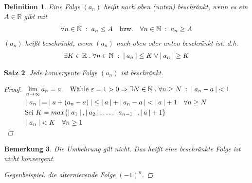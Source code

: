 \documentclass[a4paper,titlepage,oneside]{article}
\def\N{\ensuremath{\mathbb{N}} }
\def\R{\ensuremath{\mathbb{R}} }
\renewcommand{\epsilon}{\ensuremath{\varepsilon} }
\def\lor{\ensuremath{\vee}}
\def\sp{\hspace{0,1cm}}
\def\spdot{\sp.\sp}
\def\spcolon{\sp:\sp}
\renewcommand{\liminf}[2][n]{\ensuremath{\lim\limits_{#1 \rightarrow \infty}{#2}}}
\newcommand{\abs}[1]{\ensuremath{\left|\:#1\:\right|}}
\theoremstyle{thmstyle}
\newtheorem{satz}{Satz}[section]
\newtheorem{defi}[satz]{Definition}
\newtheorem{bem}[satz]{Bemerkung}
\theoremstyle{subthmstyle}
\begin{document}
\begin{defi}
Eine Folge \((a_n)\) heißt nach oben (unten) beschränkt, wenn es ein \(A \in \R\) gibt mit \[\forall n \in \N \spcolon a_n \le A \quad \text{bzw.} \quad \forall n \in \N \spcolon a_n \ge A\]
\((a_n)\) heißt beschränkt, wenn \((a_n)\) nach oben oder unten beschränkt ist. d.h. \[\exists K \in \R \spdot \forall n \in \N \spcolon \abs{a_n} \le K \lor \abs{a_n} \ge K \]
\end{defi}

\begin{satz}
Jede konvergente Folge \((a_n)\) ist beschränkt.
\begin{proof}
\begin{math} \displaystyle
\begin{aligned}[t]
&\liminf{a_n} = a. \quad \text{Wähle } \epsilon = 1 > 0 \Rightarrow \exists N \in \N \spdot \forall n \ge N \spcolon \abs{a_n - a} < 1 \\
&\abs{a_n} = \abs{a + (a_n - a)} \le \abs{a} + \abs{a_n- a} < \abs{a} + 1 \quad \forall n \ge N \\
&\text{Sei } K = max\{\abs{a_1}, \abs{a_2}, \dots, \abs{a_{n-1}}, \abs{a}+1\} \\
&\abs{a_n} < K \quad \forall n \ge 1 \\
\end{aligned}
\end{math}\\
\end{proof}
\end{satz}

\begin{bem}
Die Umkehrung gilt nicht. Das heißt eine beschränkte Folge ist nicht konvergent.
\begin{proof}[Gegenbeispiel] die alternierende Folge $(-1)^n$.\end{proof}
\end{bem}
\end{document}
